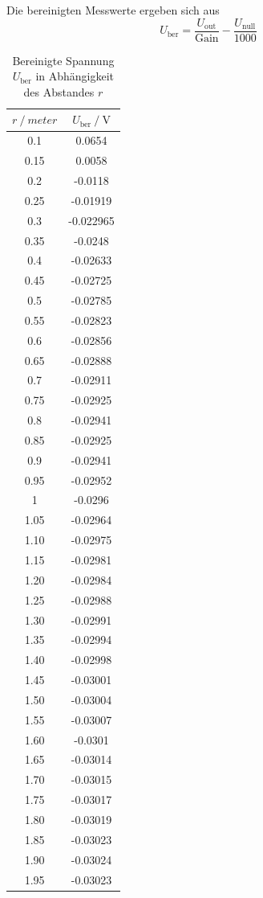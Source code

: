 Die bereinigten Messwerte ergeben sich aus
\begin{equation}
  U_\mathrm{ber} = \frac{U_\mathrm{out}}{\text{Gain}} - \frac{U_\mathrm{null}}{1000}
\end {equation}

\begin{table}
  \centering
  \caption{Bereinigte Spannung $U_{\mathrm{ber}}$ in Abhängigkeit des Abstandes $r$}
  \label{tab:photodetektor}
  \begin{tabular}{cc}
    \toprule {$r \:/\: meter$} & {$U_{\mathrm{ber}} \:/\: \si{\volt}$} \\
    \midrule
    0.1 & 0.0654 \\
    0.15 & 0.0058 \\
    0.2 & -0.0118 \\
    0.25 & -0.01919 \\
    0.3 & -0.022965 \\
    0.35 & -0.0248 \\
    0.4 & -0.02633 \\
    0.45 & -0.02725 \\
    0.5 & -0.02785 \\
    0.55 & -0.02823 \\
    0.6 & -0.02856 \\
    0.65 & -0.02888 \\
    0.7 & -0.02911 \\
    0.75 & -0.02925 \\
    0.8 & -0.02941 \\
    0.85 & -0.02925 \\
    0.9 & -0.02941 \\
    0.95 & -0.02952 \\
    1 & -0.0296 \\
    1.05 & -0.02964 \\
    1.10 & -0.02975 \\
    1.15 & -0.02981 \\
    1.20 & -0.02984 \\
    1.25 & -0.02988 \\
    1.30 & -0.02991 \\
    1.35 & -0.02994 \\
    1.40 & -0.02998 \\
    1.45 & -0.03001 \\
    1.50 & -0.03004 \\
    1.55 & -0.03007 \\
    1.60 & -0.0301 \\
    1.65 & -0.03014 \\
    1.70 & -0.03015 \\
    1.75 & -0.03017 \\
    1.80 & -0.03019 \\
    1.85 & -0.03023 \\
    1.90 & -0.03024 \\
    1.95 & -0.03023 \\
    \bottomrule
   \end{tabular}
  \end{table}
